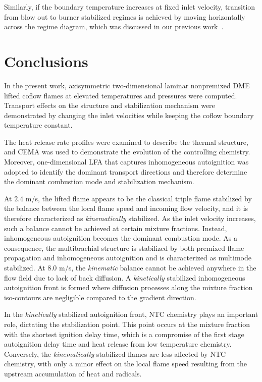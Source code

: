 \documentclass[review,3p,times]{elsarticle}
\begin{document}
Similarly, if the boundary temperature increases at fixed inlet velocity, transition from blow out to burner stabilized regimes is achieved by moving horizontally across the regime diagram, which was discussed in our previous work~\cite{deng15}.     



\section{Conclusions}

In the present work, axisymmetric two-dimensional laminar nonpremixed DME lifted coflow flames at elevated temperatures and pressures were computed.  Transport effects on the structure and stabilization mechanism were demonstrated by changing the inlet velocities while keeping the coflow boundary temperature constant.

The heat release rate profiles were examined to describe the thermal structure, and CEMA was used to demonstrate the evolution of the controlling chemistry.  Moreover, one-dimensional LFA that captures inhomogeneous autoignition was adopted to identify the dominant transport directions and therefore determine the dominant combustion mode and stabilization mechanism.

At $2.4$ m/s, the lifted flame appears to be the classical triple flame stabilized by the balance between the local flame speed and incoming flow velocity, and it is therefore characterized as \emph {kinematically} stabilized.  As the inlet velocity increases, such a balance cannot be achieved at certain mixture fractions.  Instead, inhomogeneous autoignition becomes the dominant combustion mode.  As a consequence, the multibrachial structure is stabilized by both premixed flame propagation and inhomogeneous autoignition and is characterized as multimode stabilized.  At $8.0$ m/s, the \emph{kinematic} balance cannot be achieved anywhere in the flow field due to lack of back diffusion.  A \emph{kinetically} stabilized inhomogeneous autoignition front is formed where diffusion processes along the mixture fraction iso-contours are negligible compared to the gradient direction.

\textcolor{cm}{In the \emph{kinetically} stabilized autoignition front, NTC chemistry plays an important role, dictating the stabilization point.  This point occurs at the mixture fraction with the shortest ignition delay time, which is a compromise of the first stage autoignition delay time and heat release from low temperature chemistry.  Conversely, the \emph{kinematically} stabilized flames are less affected by NTC chemistry, with only a minor effect on the local flame speed resulting from the upstream accumulation of heat and radicals.}
\end{document}
